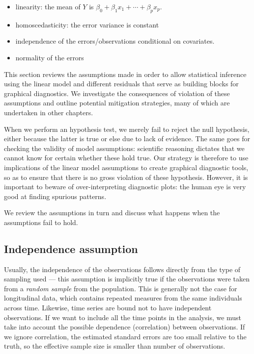 \documentclass[
  11pt,
  letterpaper,
]{scrbook}
\providecommand{\tightlist}{%
  \setlength{\itemsep}{0pt}\setlength{\parskip}{0pt}}\usepackage{longtable,booktabs,array}
\theoremstyle{definition}
\theoremstyle{definition}
\theoremstyle{plain}
\theoremstyle{plain}
\theoremstyle{remark}
\begin{document}
\begin{itemize}
\tightlist
\item
  linearity: the mean of \(Y\) is
  \(\beta_0 + \beta_1x_1 + \cdots + \beta_p x_p\).
\item
  homoscedasticity: the error variance is constant
\item
  independence of the errors/observations conditional on covariates.
\item
  normality of the errors
\end{itemize}

This section reviews the assumptions made in order to allow statistical
inference using the linear model and different residuals that serve as
building blocks for graphical diagnostics. We investigate the
consequences of violation of these assumptions and outline potential
mitigation strategies, many of which are undertaken in other chapters.

When we perform an hypothesis test, we merely fail to reject the null
hypothesis, either because the latter is true or else due to lack of
evidence. The same goes for checking the validity of model assumptions:
scientific reasoning dictates that we cannot know for certain whether
these hold true. Our strategy is therefore to use implications of the
linear model assumptions to create graphical diagnostic tools, so as to
ensure that there is no gross violation of these hypothesis. However, it
is important to beware of over-interpreting diagnostic plots: the human
eye is very good at finding spurious patterns.

We review the assumptions in turn and discuss what happens when the
assumptions fail to hold.

\subsection{Independence assumption}\label{independence-assumption}

Usually, the independence of the observations follows directly from the
type of sampling used --- this assumption is implicitly true if the
observations were taken from a \emph{random sample} from the population.
This is generally not the case for longitudinal data, which contains
repeated measures from the same individuals across time. Likewise, time
series are bound not to have independent observations. If we want to
include all the time points in the analysis, we must take into account
the possible dependence (correlation) between observations. If we ignore
correlation, the estimated standard errors are too small relative to the
truth, so the effective sample size is smaller than number of
observations.
\end{document}
